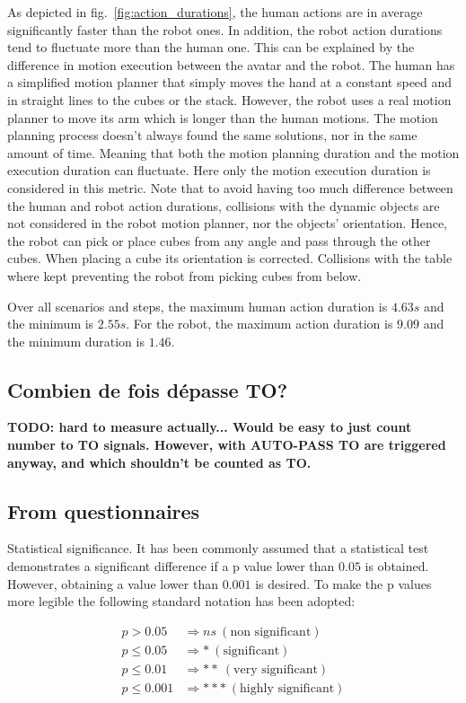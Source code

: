 As depicted in fig.~\ref{fig:action_durations}, the human actions are in average significantly faster than the robot ones. In addition, the robot action durations tend to fluctuate more than the human one. This can be explained by the difference in motion execution between the avatar and the robot. The human has a simplified motion planner that simply moves the hand at a constant speed and in straight lines to the cubes or the stack. However, the robot uses a real motion planner to move its arm which is longer than the human motions. The motion planning process doesn't always found the same solutions, nor in the same amount of time. Meaning that both the motion planning duration and the motion execution duration can fluctuate. Here only the motion execution duration is considered in this metric. Note that to avoid having too much difference between the human and robot action durations, collisions with the dynamic objects are not considered in the robot motion planner, nor the objects' orientation. Hence, the robot can pick or place cubes from any angle and pass through the other cubes. When placing a cube its orientation is corrected. Collisions with the table where kept preventing the robot from picking cubes from below.  

Over all scenarios and steps, the maximum human action duration is $4.63s$ and the minimum is  $2.55s$. For the robot, the maximum action duration is $9.09$ and the minimum duration is $1.46$.

\subsection*{Combien de fois dépasse TO?}
\textbf{TODO: hard to measure actually... Would be easy to just count number to TO signals. However, with AUTO-PASS TO are triggered anyway, and which shouldn't be counted as TO.}

\subsection{From questionnaires}

Statistical significance. It has been commonly assumed that a statistical test demonstrates a significant difference if a p value lower than $0.05$ is obtained. However, obtaining a value lower than $0.001$ is desired. To make the p values more legible the following standard notation has been adopted:

\begin{align*}
    p > 0.05        & \Rightarrow ns ~ (\textrm{non significant})\\
    p \leq 0.05     & \Rightarrow * ~ (\textrm{significant})\\
    p \leq 0.01     & \Rightarrow ** ~ (\textrm{very significant})\\
    p \leq 0.001    & \Rightarrow *** ~ (\textrm{highly significant})\\
\end{align*}

